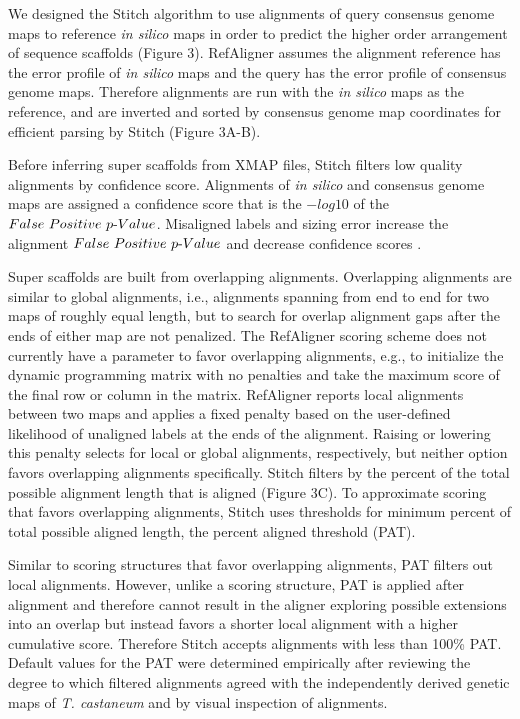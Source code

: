 \documentclass{bmcart}
\begin{document}
We designed the Stitch algorithm to use alignments of query consensus genome maps to reference \textit{in silico} maps in order to predict the higher order arrangement of sequence scaffolds  (Figure 3). RefAligner assumes the alignment reference has the error profile of \textit{in silico} maps and the query has the error profile of consensus genome maps. Therefore alignments are run with the \textit{in silico} maps as the reference, and are inverted and sorted by consensus genome map coordinates for efficient parsing by Stitch (Figure 3A-B). 

Before inferring super scaffolds from XMAP files, Stitch filters low quality alignments by confidence score. Alignments of \textit{in silico} and consensus genome maps are assigned a confidence score that is the $-log10$ of the $False\textnormal{ }Positive\textnormal{ }p\textnormal{-}Value$. Misaligned labels and sizing error increase the alignment $False\textnormal{ }Positive\textnormal{ }p\textnormal{-}Value$ and decrease confidence scores \cite{ProbFP}.

Super scaffolds are built from overlapping alignments. Overlapping alignments are similar to global alignments, i.e., alignments spanning from end to end for two maps of roughly equal length, but to search for overlap alignment gaps after the ends of either map are not penalized. The RefAligner scoring scheme does not currently have a parameter to favor overlapping alignments, e.g., to initialize the dynamic programming matrix with no penalties and take the maximum score of the final row or column in the matrix. RefAligner reports local alignments between two maps and applies a fixed penalty based on the user-defined likelihood of unaligned labels at the ends of the alignment. Raising or lowering this penalty selects for local or global alignments, respectively, but neither option favors overlapping alignments specifically. Stitch filters by the percent of the total possible alignment length that is aligned (Figure 3C). To approximate scoring that favors overlapping alignments, Stitch uses thresholds for minimum percent of total possible aligned length, the percent aligned threshold (PAT). 

Similar to scoring structures that favor overlapping alignments, PAT filters out local alignments. However, unlike a scoring structure, PAT is applied after alignment and therefore cannot result in the aligner exploring possible extensions into an overlap but instead favors a shorter local alignment with a higher cumulative score. Therefore Stitch accepts alignments with less than 100\% PAT. Default values for the PAT were determined empirically after reviewing the degree to which filtered alignments agreed with the independently derived genetic maps of \textit{T. castaneum} and by visual inspection of alignments.
\end{document}

